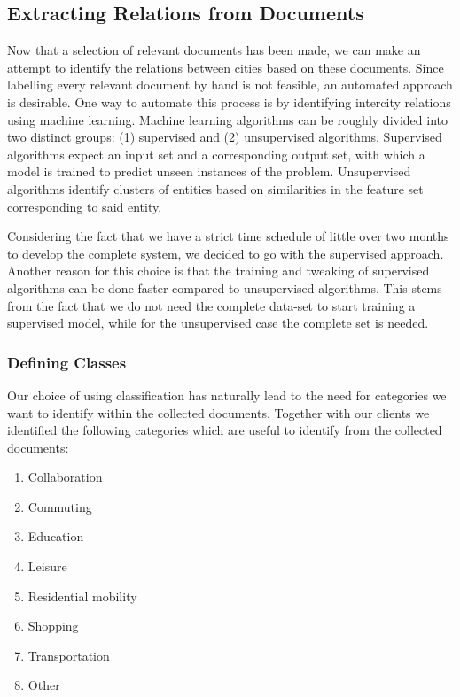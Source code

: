 \subsection{Extracting Relations from Documents}
Now that a selection of relevant documents has been made, we can make an attempt to identify the relations between cities based on these documents. Since labelling every relevant document by hand is not feasible, an automated approach is desirable. 
One way to automate this process is by identifying intercity relations using machine learning. Machine learning algorithms can be roughly divided into two distinct groups: (1) supervised and (2) unsupervised algorithms. Supervised algorithms expect an input set and a corresponding output set, with which a model is trained to predict unseen instances of the problem. Unsupervised algorithms identify clusters of entities based on similarities in the feature set corresponding to said entity.

Considering the fact that we have a strict time schedule of little over two months to develop the complete system, we decided to go with the supervised approach. 
Another reason for this choice is that the training and tweaking of supervised algorithms can be done faster compared to unsupervised algorithms. This stems from the fact that we do not need the complete data-set to start training a supervised model, while for the unsupervised case the complete set is needed.

\subsubsection{Defining Classes}
Our choice of using classification has naturally lead to the need for categories we want to identify within the collected documents. Together with our clients we identified the following categories which are useful to identify from the collected documents:\\

\begin{enumerate}
    \item Collaboration
    \item Commuting
    \item Education
    \item Leisure
    \item Residential mobility
    \item Shopping
    \item Transportation
    \item Other
\end{enumerate}

